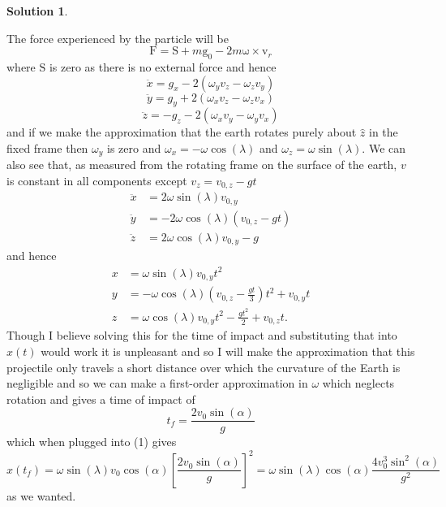 \documentclass[10pt]{article}
\theoremstyle{definition}
\newtheorem{soln}{Solution}
\newcommand{\uz}{\hat{z}}
\newcommand{\bv}[1]{\bm{\mathrm{#1}}}
\begin{document}
\begin{soln}
\begin{center}
  \end{center}

  The force experienced by the particle will be
  $$\bv{F}=\bv{S}+m\bv{g}_0-2m \bv{\omega}\times \bv{v}_r$$
  where $\bv{S}$ is zero as there is no external force and hence
  $$\ddot{x}=g_x-2\left(\omega_yv_z-\omega_zv_y\right)$$
  $$\ddot{y}=g_y+2\left(\omega_xv_z-\omega_zv_x\right)$$
  $$\ddot{z}=-g_z-2\left(\omega_xv_y-\omega_yv_x\right)$$
  and if we make the approximation that the earth rotates purely about $\uz$ in the fixed frame then $\omega_y$ is zero and
  $\omega_x=-\omega\cos(\lambda)$ and $\omega_z=\omega\sin(\lambda)$. We can also see that, as measured from the rotating frame on the surface of the earth,
  $v$ is constant in all components except $v_z=v_{0,z}-gt$
  \begin{align*}
    \ddot{x} & =2\omega\sin(\lambda)v_{0,y}       \\
    \ddot{y} & =-2\omega\cos(\lambda)(v_{0,z}-gt) \\
    \ddot{z} & =2\omega\cos(\lambda)v_{0,y}-g
  \end{align*}
  and hence
  \begin{align}
    x & =\omega\sin(\lambda)v_{0,y}t^2                          \\
    y & =-\omega\cos(\lambda)(v_{0,z}-\frac{gt}{3})t^2+v_{0,y}t \\
    z & =\omega\cos(\lambda)v_{0,y}t^2-\frac{gt^2}{2}+v_{0,z}t.
  \end{align}
  Though I believe solving this for the time of impact and substituting that into $x(t)$ would work it is unpleasant and so I will make the approximation
  that this projectile only travels a short distance over which the curvature of the Earth is negligible and so we can make a first-order approximation in
  $\omega$ which neglects rotation and gives a time of impact of $$t_f=\frac{2v_0\sin(\alpha)}{g}$$
  which when plugged into (1) gives
  $$x(t_f)=\omega\sin(\lambda)v_{0}\cos(\alpha)\left[\frac{2v_0\sin(\alpha)}{g}\right]^2
    =\omega\sin(\lambda)\cos(\alpha)\frac{4v_0^3\sin^2(\alpha)}{g^2}$$
  as we wanted.
\end{soln}
\end{document}
